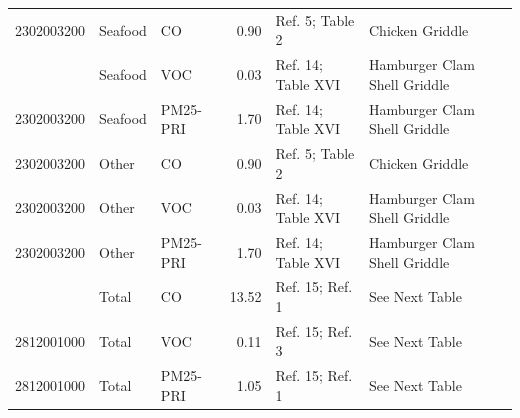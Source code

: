 \documentclass[
  11pt,
  oneside]{book}
\begin{document}
\begin{table}[H]
{\begin{tabular}[t]{rllrll}
2302003200 & Seafood & CO & 0.90 & Ref. 5; Table 2 & Chicken Griddle\\
\addlinespace
2302003200 & Seafood & VOC & 0.03 & Ref. 14; Table XVI & Hamburger Clam Shell Griddle\\
2302003200 & Seafood & PM25-PRI & 1.70 & Ref. 14; Table XVI & Hamburger Clam Shell Griddle\\
2302003200 & Other & CO & 0.90 & Ref. 5; Table 2 & Chicken Griddle\\
2302003200 & Other & VOC & 0.03 & Ref. 14; Table XVI & Hamburger Clam Shell Griddle\\
2302003200 & Other & PM25-PRI & 1.70 & Ref. 14; Table XVI & Hamburger Clam Shell Griddle\\
\addlinespace
2812001000 & Total & CO & 13.52 & Ref. 15; Ref. 1 & See Next Table\\
2812001000 & Total & VOC & 0.11 & Ref. 15; Ref. 3 & See Next Table\\
2812001000 & Total & PM25-PRI & 1.05 & Ref. 15; Ref. 1 & See Next Table\\
\bottomrule
\end{tabular}}
\end{table}
\end{document}
